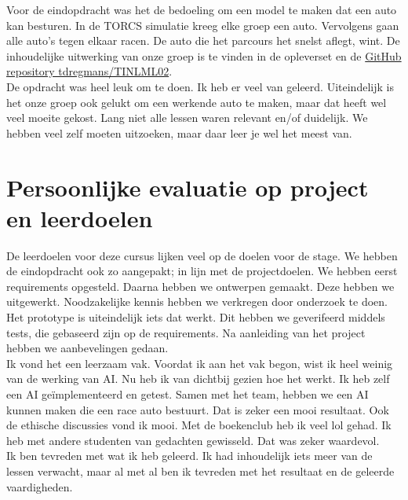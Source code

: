 \documentclass{article} %
\begin{document}
            Voor de eindopdracht was het de bedoeling om een model te maken dat een auto kan besturen. In de TORCS simulatie kreeg elke groep een auto. Vervolgens gaan alle auto's tegen elkaar racen. De auto die het parcours het snelst aflegt, wint. De inhoudelijke uitwerking van onze groep is te vinden in de opleverset en de \href{https://github.com/tdregmans/TINLML02}{GitHub repository tdregmans/TINLML02}. \\
            De opdracht was heel leuk om te doen. Ik heb er veel van geleerd. Uiteindelijk is het onze groep ook gelukt om een werkende auto te maken, maar dat heeft wel veel moeite gekost. Lang niet alle lessen waren relevant en/of duidelijk. We hebben veel zelf moeten uitzoeken, maar daar leer je wel het meest van. 
    
        \newpage


    \section{Persoonlijke evaluatie op project en leerdoelen}

    De leerdoelen voor deze cursus lijken veel op de doelen voor de stage. We hebben de eindopdracht ook zo aangepakt; in lijn met de projectdoelen. We hebben eerst requirements opgesteld. Daarna hebben we ontwerpen gemaakt. Deze hebben we uitgewerkt. Noodzakelijke kennis hebben we verkregen door onderzoek te doen. Het prototype is uiteindelijk iets dat werkt. Dit hebben we geverifeerd middels tests, die gebaseerd zijn op de requirements. Na aanleiding van het project hebben we aanbevelingen gedaan. \\
    Ik vond het een leerzaam vak. Voordat ik aan het vak begon, wist ik heel weinig van de werking van AI. Nu heb ik van dichtbij gezien hoe het werkt. Ik heb zelf een AI geïmplementeerd en getest. Samen met het team, hebben we een AI kunnen maken die een race auto bestuurt. Dat is zeker een mooi resultaat. Ook de ethische discussies vond ik mooi. Met de boekenclub heb ik veel lol gehad. Ik heb met andere studenten van gedachten gewisseld. Dat was zeker waardevol. \\
    Ik ben tevreden met wat ik heb geleerd. Ik had inhoudelijk iets meer van de lessen verwacht, maar al met al ben ik tevreden met het resultaat en de geleerde vaardigheden.

    \newpage
\end{document}
